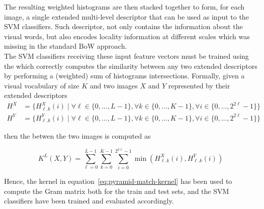 \documentclass[../main.tex]{subfiles}
\begin{document}
The resulting weighted histograms are then stacked together to form, for each image, a single extended multi-level descriptor that can be used as input to the SVM classifiers. Such descriptor, not only contains the information about the visual words, but also encodes locality information at different scales which was missing in the standard BoW approach.\\
The SVM classifiers receiving these input feature vectors must be trained using the  which correctly computes the similarity between any two extended descriptors by performing a (weighted) sum of histograms intersections. Formally, given a visual vocabulary of size $K$ and two images $X$ and $Y$ represented by their extended descriptors
\begin{equation*}
  \begin{aligned}
    H^{X} &= \{H_{\ell. k}^{X}(i) \mid  \forall \ell \in \{0,\dots,L-1\}, \forall k \in \{0,\dots,K-1\}, \forall i \in \{0,\dots,2^{2 \ell}-1\}\} \\
    H^{Y} &= \{H_{\ell. k}^{Y}(i) \mid  \forall \ell \in \{0,\dots,L-1\}, \forall k \in \{0,\dots,K-1\}, \forall i \in \{0,\dots,2^{2 \ell}-1\}\}
  \end{aligned}
\end{equation*}

then the  betwen the two images is computed as

\begin{equation}\label{eq:pyramid-match-kernel}
  K^{L}(X,Y) = 
  \sum_{\ell=0}^{L-1}
  \sum_{k=0}^{K-1}
  \sum_{i=0}^{2^{2 \ell}-1}
  \min\left(H_{\ell. k}^{X}(i), H_{\ell. k}^{Y}(i)\right)
\end{equation}

Hence, the kernel in equation~\ref{eq:pyramid-match-kernel} has been used to compute the Gram matrix both for the train and test sets, and the SVM classifiers have been trained and evaluated accordingly.\\

\end{document}
